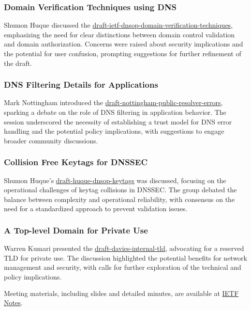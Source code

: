 \documentclass{article}
\begin{document}
\subsubsection{Domain Verification Techniques using DNS}
Shumon Huque discussed the \href{https://datatracker.ietf.org/doc/html/draft-ietf-dnsop-domain-verification-techniques}{draft-ietf-dnsop-domain-verification-techniques}, emphasizing the need for clear distinctions between domain control validation and domain authorization. Concerns were raised about security implications and the potential for user confusion, prompting suggestions for further refinement of the draft.

\subsubsection{DNS Filtering Details for Applications}
Mark Nottingham introduced the \href{https://datatracker.ietf.org/doc/html/draft-nottingham-public-resolver-errors}{draft-nottingham-public-resolver-errors}, sparking a debate on the role of DNS filtering in application behavior. The session underscored the necessity of establishing a trust model for DNS error handling and the potential policy implications, with suggestions to engage broader community discussions.

\subsubsection{Collision Free Keytags for DNSSEC}
Shumon Huque's \href{https://datatracker.ietf.org/doc/html/draft-huque-dnsop-keytags}{draft-huque-dnsop-keytags} was discussed, focusing on the operational challenges of keytag collisions in DNSSEC. The group debated the balance between complexity and operational reliability, with consensus on the need for a standardized approach to prevent validation issues.

\subsubsection{A Top-level Domain for Private Use}
Warren Kumari presented the \href{https://datatracker.ietf.org/doc/html/draft-davies-internal-tld}{draft-davies-internal-tld}, advocating for a reserved TLD for private use. The discussion highlighted the potential benefits for network management and security, with calls for further exploration of the technical and policy implications.

Meeting materials, including slides and detailed minutes, are available at \href{https://notes.ietf.org/notes-ietf-122-dnsop}{IETF Notes}.
\end{document}
